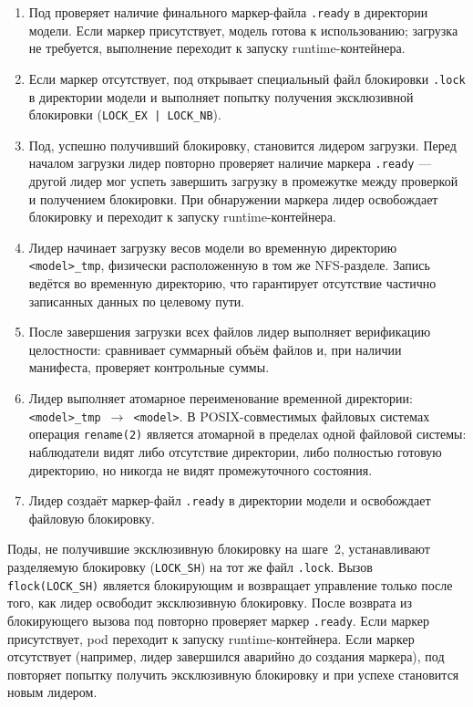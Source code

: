\begin{enumerate}[leftmargin=*]
  \item Под проверяет наличие финального маркер-файла \texttt{.ready} в директории модели. Если маркер присутствует, модель готова к использованию; загрузка не требуется, выполнение переходит к запуску runtime-контейнера.
  \item Если маркер отсутствует, под открывает специальный файл блокировки \texttt{.lock} в директории модели и выполняет попытку получения эксклюзивной блокировки (\texttt{LOCK\_EX | LOCK\_NB}).
  \item Под, успешно получивший блокировку, становится лидером загрузки. Перед началом загрузки лидер повторно проверяет наличие маркера \texttt{.ready} — другой лидер мог успеть завершить загрузку в промежутке между проверкой и получением блокировки. При обнаружении маркера лидер освобождает блокировку и переходит к запуску runtime-контейнера.
  \item Лидер начинает загрузку весов модели во временную директорию \texttt{<model>\_tmp}, физически расположенную в том же NFS-разделе. Запись ведётся во временную директорию, что гарантирует отсутствие частично записанных данных по целевому пути.
  \item После завершения загрузки всех файлов лидер выполняет верификацию целостности: сравнивает суммарный объём файлов и, при наличии манифеста, проверяет контрольные суммы.
  \item Лидер выполняет атомарное переименование временной директории: \texttt{<model>\_tmp $\to$ <model>}. В POSIX-совместимых файловых системах операция \texttt{rename(2)} является атомарной в пределах одной файловой системы: наблюдатели видят либо отсутствие директории, либо полностью готовую директорию, но никогда не видят промежуточного состояния.
  \item Лидер создаёт маркер-файл \texttt{.ready} в директории модели и освобождает файловую блокировку.
\end{enumerate}

Поды, не получившие эксклюзивную блокировку на шаге~2, устанавливают разделяемую блокировку (\texttt{LOCK\_SH}) на тот же файл \texttt{.lock}. Вызов \texttt{flock(LOCK\_SH)} является блокирующим и возвращает управление только после того, как лидер освободит эксклюзивную блокировку. После возврата из блокирующего вызова под повторно проверяет маркер \texttt{.ready}. Если маркер присутствует, pod переходит к запуску runtime-контейнера. Если маркер отсутствует (например, лидер завершился аварийно до создания маркера), под повторяет попытку получить эксклюзивную блокировку и при успехе становится новым лидером.

